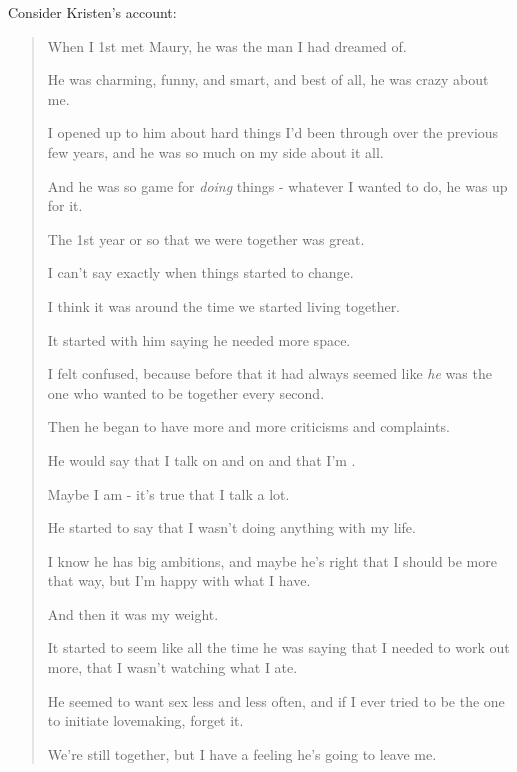 \documentclass[oneside]{article}
\numberwithin{equation}{section}
\begin{document}
Consider Kristen's account:
\begin{quotation}
    When I 1st met Maury, he was the man I had dreamed of.
    
    
    He was charming, funny, and smart, and best of all, he was crazy about me.
    
    I opened up to him about hard things I'd been through over the previous few years, and he was so much on my side about it all.
    
    And he was so game for \textit{doing} things - whatever I wanted to do, he was up for it.
    
    The 1st year or so that we were together was great.
    
    I can't say exactly when things started to change.
    
    I think it was around the time we started living together.
    
    It started with him saying he needed more space.
    
    I felt confused, because before that it had always seemed like \textit{he} was the one who wanted to be together every second.
    
    Then he began to have more and more criticisms and complaints.
    
    He would say that I talk on and on and that I'm .
    
    Maybe I am - it's true that I talk a lot.
    
    
    He started to say that I wasn't doing anything with my life.
    
    I know he has big ambitions, and maybe he's right that I should be more that way, but I'm happy with what I have.
    
    And then it was my weight.
    
    It started to seem like all the time he was saying that I needed to work out more, that I wasn't watching what I ate.
    
    
    He seemed to want sex less and less often, and if I ever tried to be the one to initiate lovemaking, forget it.
    
    We're still together, but I have a feeling he's going to leave me.
    

\end{quotation}
\end{document}
